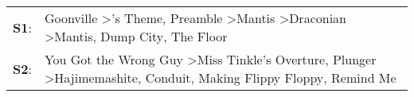 \begin{supertabular}{p{0.03\textwidth}p{0.92\textwidth}}
 \textbf{S1}:  &  Goonville\textsuperscript{} \textgreater {}'s Theme\textsuperscript{}, \enspace Preamble\textsuperscript{} \textgreater \enspace Mantis\textsuperscript{} \textgreater \enspace Draconian\textsuperscript{} \textgreater \enspace Mantis\textsuperscript{}, \enspace Dump City\textsuperscript{}, \enspace The Floor\textsuperscript{}  \enspace  \\
 \textbf{S2}:  &                      You Got the Wrong Guy\textsuperscript{} \textgreater \enspace Miss Tinkle's Overture\textsuperscript{}, \enspace Plunger\textsuperscript{} \textgreater \enspace Hajimemashite\textsuperscript{}, \enspace Conduit\textsuperscript{}, \enspace Making Flippy Floppy\textsuperscript{}, \enspace Remind Me\textsuperscript{}  \enspace  \\
\end{supertabular}
